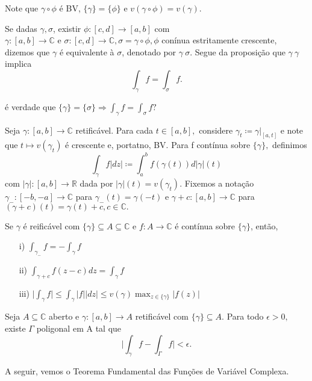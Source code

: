 \documentclass[complex.tex]{subfiles}
\begin{document}
\begin{proof*}
	\begin{exer*}
		Note que $\gamma\circ{\phi}$ é BV, $\{\gamma\}=\{\phi\} $ e $v(\gamma\circ{\phi}) = v(\gamma).$
	\end{exer*}
\end{proof*}
Se dadas $\gamma, \sigma$, existir $\phi:[c, d]\rightarrow [a, b]$ com $\gamma:[a, b]\rightarrow \mathbb{C}\text{ e }\sigma:[c, d]\rightarrow \mathbb{C},
	\sigma = \gamma\circ{\phi}, \phi$ conínua estritamente crescente, dizemos que $\gamma $ é equivalente à $\sigma$, denotado por $\gamma~\sigma.$
Segue da proposição que $\gamma~\gamma$ implica
$$
	\int_{\gamma}^{}f = \int_{\sigma}^{}f.
$$
\begin{exer*}
	é verdade que $\{\gamma\}=\{\sigma\}\Rightarrow \int_{\gamma}^{}f = \int_{\sigma}^{}f?$
\end{exer*}
Seja $\gamma:[a, b]\rightarrow \mathbb{C}$ retificável. Para cada $t\in{[a, b]},$ considere $\gamma_t\coloneqq \gamma|_[a, t]$ e
note que $t\mapsto{v(\gamma_t)}$ é crescente e, portatno, BV. Para f contínua sobre $\{\gamma\},$ definimos
$$
	\int_{\gamma}^{}f|dz|\coloneqq  \int_{a}^{b}f(\gamma(t))d|\gamma|(t)
$$
com $|\gamma|:[a, b]\rightarrow \mathbb{R}$ dada por $|\gamma|(t) = v(\gamma_t)$. Fixemos a notação $\gamma_{-}:[-b, -a]\rightarrow \mathbb{C}$
para $\gamma_{-}(t) = \gamma(-t)$ e $\gamma+c:[a, b]\rightarrow \mathbb{C}$ para $(\gamma + c)(t) = \gamma(t) + c, c\in \mathbb{C}.$
\begin{prop*}
	Se $\gamma$ é reificável com $\{\gamma\}\subseteq{A}\subseteq{\mathbb{C}} $ e $f:A\rightarrow \mathbb{C}$ é contínua sobre
	$\{\gamma\} $, então,
	\begin{itemize}
		\item[i)] $\int_{\gamma_{-}}^{}f = - \int_{\gamma}^{}f$
		\item[ii)] $\int_{\gamma+c}^{}f(z-c)dz = \int_{\gamma}^{}f$
		\item[iii)] $\biggl|\int_{\gamma}^{}f\biggr|\leq \int_{\gamma}^{}|f||dz|\leq v(\gamma)\max_{z\in \{\gamma\} }|f(z)|$
	\end{itemize}
\end{prop*}
\begin{lmm*}
	Seja $A\subseteq{\mathbb{C}}$ aberto e $\gamma:[a, b]\rightarrow A$ retificável com $\{\gamma\}\subseteq{A}$. Para todo $\epsilon > 0,$
	existe $\Gamma$ poligonal em A tal que
	$$
		\biggl|\int_{\gamma}^{}f - \int_{\Gamma}^{}f\biggr| < \epsilon.
	$$
\end{lmm*}
A seguir, vemos o Teorema Fundamental das Funções de Variável Complexa.
\end{document}
